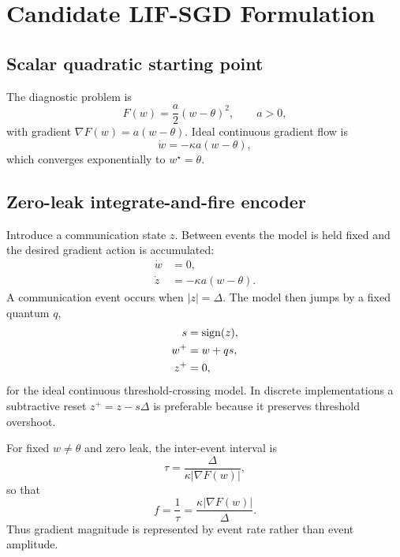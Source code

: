 \section{Candidate LIF-SGD Formulation}

\subsection{Scalar quadratic starting point}

The diagnostic problem is
\begin{equation}
  F(w)=\frac{a}{2}(w-\theta)^2,\qquad a>0,
\end{equation}
with gradient $\nabla F(w)=a(w-\theta)$. Ideal continuous gradient flow is
\begin{equation}
  \dot w=-\kappa a(w-\theta),
\end{equation}
which converges exponentially to $w^\star=\theta$.

\subsection{Zero-leak integrate-and-fire encoder}

Introduce a communication state $z$. Between events the model is held fixed and the desired gradient action is accumulated:
\begin{align}
  \dot w &= 0,\\
  \dot z &= -\kappa a(w-\theta).
\end{align}
A communication event occurs when $|z|=\Delta$. The model then jumps by a fixed quantum $q$,
\begin{align}
  s &= \operatorname{sign}(z),\\
  w^+ &= w+q s,\\
  z^+ &= 0,
\end{align}
for the ideal continuous threshold-crossing model. In discrete implementations a subtractive reset $z^+=z-s\Delta$ is preferable because it preserves threshold overshoot.

For fixed $w\neq\theta$ and zero leak, the inter-event interval is
\begin{equation}
  \tau=\frac{\Delta}{\kappa |\nabla F(w)|},
\end{equation}
so that
\begin{equation}
  f=\frac{1}{\tau}=\frac{\kappa |\nabla F(w)|}{\Delta}.
\end{equation}
Thus gradient magnitude is represented by event rate rather than event amplitude.

